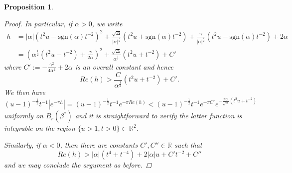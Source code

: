 \documentclass[reqno, 11pt]{amsart} %
\numberwithin{equation}{section}
\theoremstyle{plain}
\newtheorem{proposition}[theorem]{Proposition}
\theoremstyle{definition}
\theoremstyle{remark}
\newcommand{\bbR}{\mathbb R}
\begin{document}
\begin{proposition}
\begin{proof}
In particular, if $\alpha >0$, we write
\begin{align*}
h &=  |\alpha| ( t^2  u - \mathrm{sgn}(\alpha)t^{-2} )^2  +  \frac{\sqrt{\Delta}}{|\alpha|^{\frac12}} (t^2 u + \mathrm{sgn}(\alpha) t^{-2}) + \frac{\gamma}{|\alpha|^{\frac12}} (t^2 u - \mathrm{sgn}(\alpha)t^{-2}) + 2 \alpha \\
&= \left( \alpha^{\frac12} (t^2u - t^{-2}) + \frac{\gamma}{2\alpha } \right)^2 + 						 \frac{\sqrt{\Delta}}{\alpha^{\frac12}} (t^2 u +   t^{-2}) + C'
\end{align*}
where $C' := - \frac{\gamma^2}{4\alpha^{2}} + 2\alpha$ is an overall constant and hence
\[
Re(h) > \frac{C}{\alpha^{\frac12}} (t^2 u + t^{-2})  + C'.
\]
We then have
\[
(u-1)^{-\frac12} t^{-1} |e^{- \pi h}| = 	(u-1)^{-\frac12} t^{-1} e^{- \pi Re(h)} < (u-1)^{-\frac12} t^{-1} e^{- \pi C'} e^{- \frac{\pi C}{\sqrt \alpha} \left( t^2 u + t^{-2} \right) }
\]
uniformly on $B_r(\beta^*)$	and it is straightforward to verify the latter function is integrable on the region $\{ u > 1, t>0\} \subset \bbR^2$.

Similarly, if $\alpha<0$, then there are constants $C' ,C''\in\bbR$ such that
\[
Re(h) > |\alpha|(t^4 + t^{-4} ) + 2 |\alpha| u + C' t^{-2} + C''
\]
and we may conclude the argument as before.

\end{proof}

\end{proposition}
\end{document}
